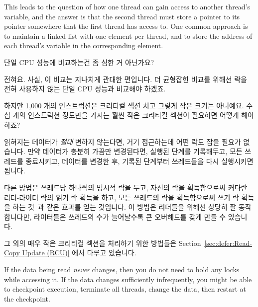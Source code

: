\begin{enumerate}
	This leads to the question of how one thread can gain access to
	another thread's  variable, and the answer is that
	the second thread must store a pointer to its 
	pointer somewhere that the first thread has access to.
	One common approach is to maintain a linked list with one 
	element per thread, and to store the address of each thread's
	 variable in the corresponding element.
	\fi

\QuickQ{}
	단일 CPU 성능에 비교하는건 좀 심한 거 아닌가요?

\QuickA{}
	전혀요.
	사실, 이 비교는 지나치게 관대한 편입니다.
	더 균형잡힌 비교를 위해선 락을 전혀 사용하지 않는 단일 CPU 성능과
	비교해야 하겠죠.

\QuickQ{}
	하지만 1,000 개의 인스트럭션은 크리티컬 섹션 치고 그렇게 작은 크기는
	아니예요. 수십 개의 인스트럭션 정도만을 가지는 훨씬 작은 크리티컬
	섹션이 필요하면 어떻게 해야하죠?

\QuickA{}
	읽혀지는 데이터가 \emph{절대} 변하지 않는다면, 거기 접근하는데 어떤
	락도 잡을 필요가 없습니다.
	만약 데이터가 충분히 가끔만 변경된다면, 실행된 단계를 기록해두고, 모든
	쓰레드를 종료시키고, 데이터를 변경한 후, 기록된 단계부터 쓰레드들을
	다시 실행시키면 됩니다.

	다른 방법은 쓰레드당 하나씩의 명시적 락을 두고, 자신의 락을
	획득함으로써 커다란 리더-라이터 락의 읽기 락 획득을 하고, 모든 쓰레드의
	락을 획득함으로써 쓰기 락 획득을 하는 것~\cite{WilsonCHsieh92a}과 같은
	효과를 얻는 것입니다.
	이 방법은 리더들을 위해선 상당히 잘 동작합니다만, 라이터들은 쓰레드의
	수가 늘어날수록 큰 오버헤드를 갖게 만들 수 있습니다.

	그 외의 매우 작은 크리티컬 섹션을 처리하기 위한 방법들은
	Section~\ref{sec:defer:Read-Copy Update (RCU)} 에서 다루고 있습니다.

	\iffalse
	If the data being read \emph{never} changes, then you do not
	need to hold any locks while accessing it.
	If the data changes sufficiently infrequently, you might be
	able to checkpoint execution, terminate all threads, change
	the data, then restart at the checkpoint.


\end{enumerate}
